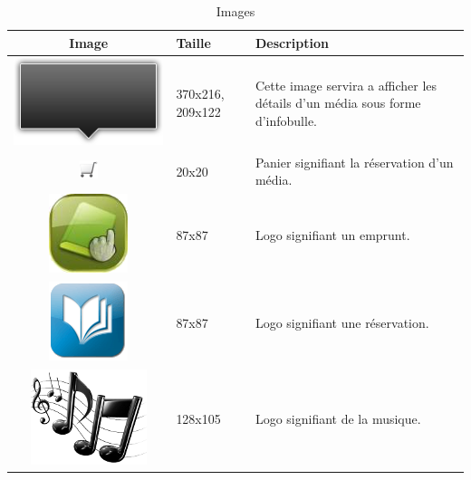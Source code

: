 \documentclass[letter, 11pt]{report}
\begin{document}
\begin{table}[ht]
	\caption{Images}
	\begin{center}
		\begin{tabular}{|c|l|l|}
		\hline
		Image                                            & Taille           & Description \\ \hline
		\includegraphics[scale=0.2]{black_arrow_big.png} & 370x216, 209x122 & Cette image servira a afficher les détails d'un média sous forme d'infobulle.\\ \hline
		\includegraphics{cart.png}                       & 20x20            & Panier signifiant la réservation d'un média. \\ \hline
		\includegraphics[scale=1.15]{emprunt.png}        & 87x87            & Logo signifiant un emprunt. \\ \hline
		\includegraphics[scale=0.3]{reservation.png}     & 87x87            & Logo signifiant une réservation. \\ \hline
		\includegraphics[scale=0.3]{musique.png}         & 128x105          & Logo signifiant de la musique. \\ \hline

\end{tabular}
\end{center}
\end{table}
\end{document}
